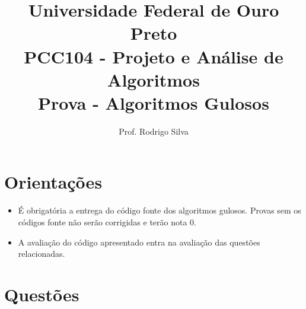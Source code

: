 \documentclass{article}
\title{\vspace{-2 cm}Universidade Federal de Ouro Preto \\ PCC104 - Projeto e Análise de Algoritmos \\ Prova - Algoritmos Gulosos}
\author{Prof. Rodrigo Silva}
\begin{document}
\maketitle

\section*{Orientações}

\begin{itemize}
    \item É obrigatória a entrega do código fonte dos algoritmos gulosos. Provas sem os códigos fonte não serão corrigidas e terão nota 0.
    \item A avaliação do código apresentado entra na avaliação das questões relacionadas. 
\end{itemize}


\section*{Questões}
\end{document}
